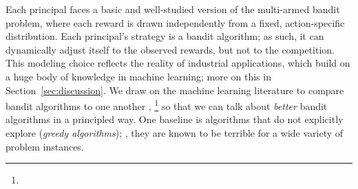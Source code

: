 
Each principal faces a basic and well-studied version of the multi-armed bandit problem, where each reward is drawn independently from a fixed, action-specific distribution. Each principal's strategy is a bandit algorithm; as such, it can dynamically adjust itself to the observed rewards, but not to the competition. This modeling choice reflects the reality of industrial applications, which build on a huge body of knowledge in machine learning; more on this in Section~\ref{sec:discussion}.
We draw on the machine learning literature to compare bandit algorithms to one another ,%
\footnote{}
 so that we can talk about \emph{better} bandit algorithms in a principled way.
One baseline is algorithms that do not explicitly explore (\emph{greedy algorithms}); , they are known to be terrible for a wide variety of problem instances.




